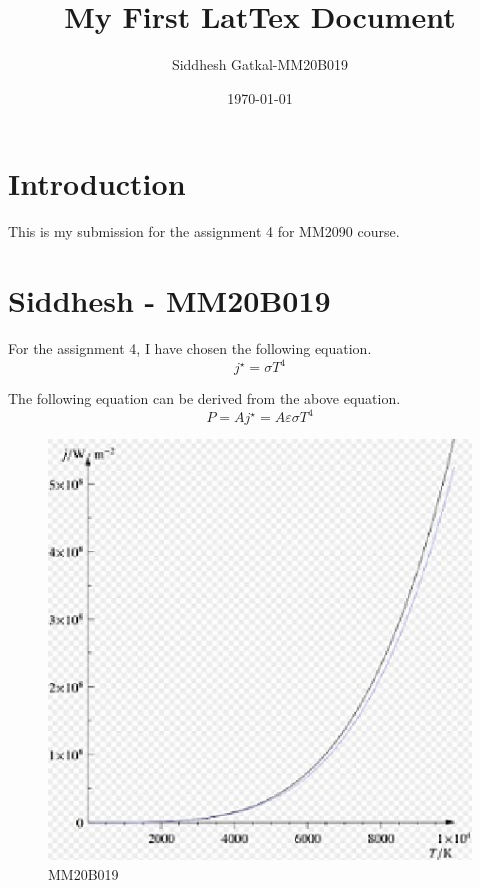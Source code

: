 \documentclass[a4paper, 12pt]{article}
\begin{document}
\title{My First LatTex Document}
\author{Siddhesh Gatkal-MM20B019}
\date{\today}
\maketitle

\tableofcontents

\section{Introduction}

This is my submission for the assignment 4 for MM2090 course.

\section{Siddhesh - MM20B019}
For the assignment 4, I have chosen the following equation.
\begin{equation}
         j^{\star} = \sigma T^{4}
        \label{eqn:stefboltz}
\end{equation}

The following equation can be derived from the above equation.
\begin{equation}
     P= A j^{\star} = A \varepsilon\sigma T^{4}
        \label{eqn2:stefboltz}
\end{equation}

\begin{figure}[h]
        \begin{center}
                \includegraphics[scale=0.80]{mm20b019.eps}
        \end{center}
        \caption{MM20B019}
        \label{graph}
\end{figure}
\end{document}
